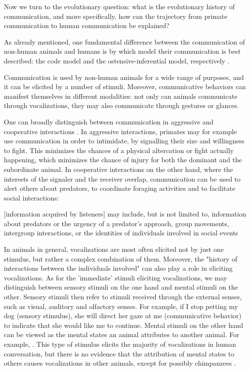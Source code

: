 Now we turn to the evolutionary question: what is the evolutionary history of communication, and more specifically, how can the trajectory from primate communication to human communication be explained?

As already mentioned, one fundamental difference between the communication of non-human animals and humans is by which model their communication is best described: the code model and the ostensive-inferential model, respectively \citep{Scott-Phillips15-primate, Scott-Phillips18-communication}.

Communication is used by non-human animals for a wide range of purposes, and it can be elicited by a number of stimuli. Moreover, communicative behaviors can manifest themselves in different modalities: not only can animals communicate through vocalizations, they may also communicate through gestures or glances.

One can broadly distinguish between communication in aggressive and cooperative interactions \citep{SeyfarthCheney03}. In aggressive interactions, primates may for example use communication in order to intimidate, by signalling their size and willingness to fight. This minimizes the chances of a physical altercation or fight actually happening, which minimizes the chance of injury for both the dominant and the subordinate animal.
In cooperative interactions on the other hand, where the interests of the signaler and the receiver overlap, communication can be used to alert others about predators, to coordinate foraging activities and to facilitate social interactions:
\begin{quoting}
    {[information acquired by listeners]} may include, but is not limited to, information about predators or the urgency of a predator’s approach, group movements, intergroup interactions, or the identities of individuals involved in social events
    \hfill \citep[p.~168]{SeyfarthCheney03}
\end{quoting}

In animals in general, vocalizations are most often elicited not by just one stimulus, but rather a complex combination of them. Moreover, the "history of interactions between the individuals involved" \citep[p.~151]{SeyfarthCheney03} can also play a role in eliciting vocalizations. As for the 'immediate' stimuli eliciting vocalizations, we may distinguish between sensory stimuli on the one hand and mental stimuli on the other. Sensory stimuli then refer to stimuli received through the external senses, such as visual, auditory and olfactory senses.
For example, if I stop petting my dog (sensory stimulus), she will direct her gaze at me (communicative behavior) to indicate that she would like me to continue.
Mental stimuli on the other hand can be viewed as the mental states an animal attributes to another animal.
For example, .
This type of stimulus elicits the majority of vocalizations in human conversation, but there is no evidence that the attribution of mental states to others causes vocalizations in other animals, except for possibly chimpanzees \citep{SeyfarthCheney03}.

